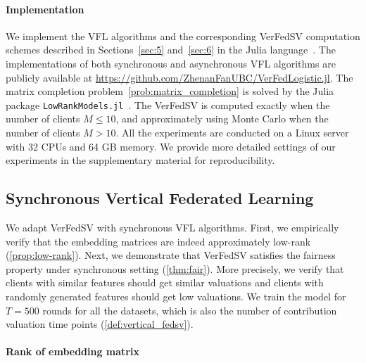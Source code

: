 \paragraph{Implementation} We implement the VFL algorithms and the corresponding VerFedSV computation schemes described in Sections~\ref{sec:5} and~\ref{sec:6} in the Julia language~\cite{bezanson2017julia}. The implementations of both synchronous and asynchronous VFL algorithms are publicly available at
\url{https://github.com/ZhenanFanUBC/VerFedLogistic.jl}. 
The matrix completion problem~\eqref{prob:matrix_completion} is solved by the Julia package \texttt{LowRankModels.jl}~\cite{glrm}.
The VerFedSV is computed exactly when the number of clients $M \leq 10$, and approximately using Monte Carlo when the number of clients $M > 10$. All the experiments are conducted on a Linux server with 32 CPUs and 64 GB memory. We provide more detailed settings of our experiments in the supplementary material for reproducibility.

\subsection{Synchronous Vertical Federated Learning} \label{sec:8.8.2}

We adapt VerFedSV with synchronous VFL algorithms. First, we empirically verify that the embedding matrices are indeed approximately low-rank (\autoref{prop:low-rank}). Next, we demonstrate that VerFedSV satisfies the fairness property under synchronous setting (\autoref{thm:fair}). More precisely, we verify that clients with similar features should get similar valuations and clients with randomly generated features should get low valuations. We train the model for $T = 500$ rounds for all the datasets, which is also the number of contribution valuation time points (\autoref{def:vertical_fedsv}).

\paragraph{Rank of embedding matrix}

